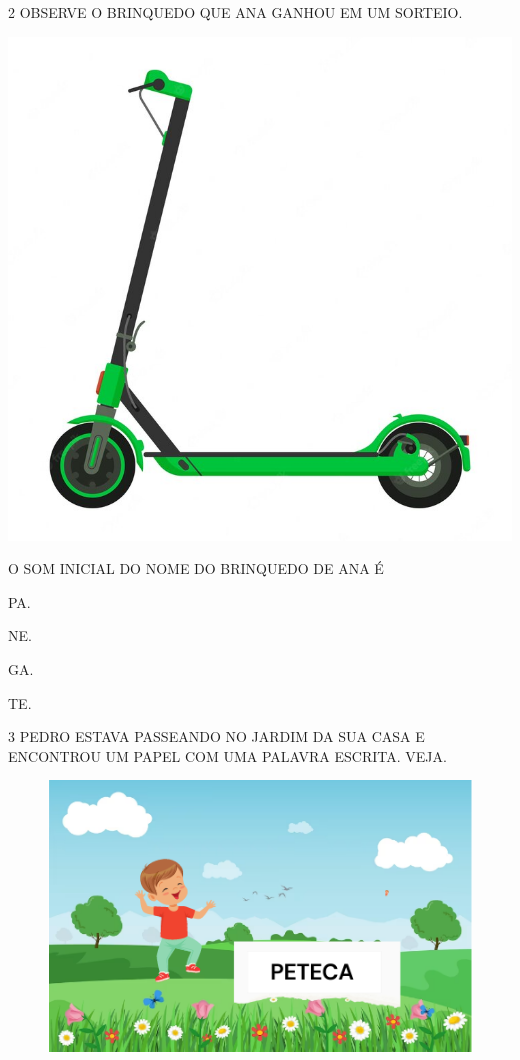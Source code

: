 \num{2} OBSERVE O BRINQUEDO QUE ANA GANHOU EM UM SORTEIO.

\begin{center}
\includegraphics[width=.5\textwidth]{media/image83.png}
\end{center}

O SOM INICIAL DO NOME DO BRINQUEDO DE ANA É

\begin{multicols}{4}
\begin{escolha}
\item PA.

\item NE.

\item GA.

\item TE.
\end{escolha}
\end{multicols}

\num{3} PEDRO ESTAVA PASSEANDO NO JARDIM DA SUA CASA E ENCONTROU UM PAPEL COM UMA PALAVRA ESCRITA. VEJA.

\begin{figure}[H]
\centering
\includegraphics[width=.8\textwidth]{media/image84.png}
\end{figure}

